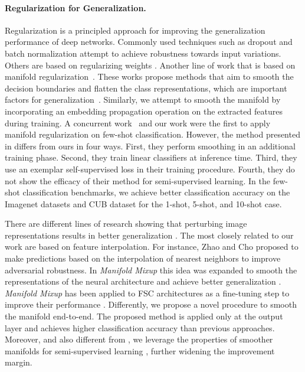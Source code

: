 \documentclass[runningheads]{llncs}
\begin{document}
\paragraph{Regularization for Generalization.} 
Regularization is a principled approach for improving the generalization performance of deep networks. Commonly used techniques such as dropout \cite{srivastava2014dropout} and batch normalization \cite{ioffe2015batch} attempt to achieve robustness towards input variations. Others are based on regularizing weights \cite{rodriguez2016regularizing,salimans2016weight}. Another line of work that is based on manifold regularization~\cite{zhang2018mixup,verma2019manifold,tokozume2018between,belkin2006manifold}. These works propose methods that aim to smooth the decision boundaries and flatten the class representations, which are important factors for generalization~\cite{lee1995lower,bartlett1999generalization}. Similarly, we attempt to smooth the manifold by incorporating an embedding propagation operation on the extracted features during training. A concurrent work~\cite{mangla2019charting} and our work were the  first to apply manifold regularization on few-shot classification. However, the method presented in \cite{mangla2019charting} differs from ours in four ways. First, they perform smoothing in an additional training phase. Second, they train linear classifiers at inference time. Third, they use an exemplar self-supervised loss in their training procedure. Fourth, they do not show the efficacy of their method for semi-supervised learning. In the few-shot classification benchmarks, we achieve better classification accuracy on the Imagenet datasets and CUB dataset for the 1-shot, 5-shot, and 10-shot case.

 There are different lines of research showing that perturbing image representations results in better generalization \cite{srivastava2014dropout,ioffe2015batch}. The most closely related to our work are based on feature interpolation. For instance, Zhao and Cho \cite{cho2019retrieval} proposed to make predictions based on the interpolation of nearest neighbors to improve adversarial robustness. In \textit{Manifold Mixup} this idea was expanded to smooth the representations of the neural architecture and achieve better generalization \cite{bartlett1999generalization,lee1995lower}. \textit{Manifold Mixup} has been applied to FSC architectures as a  fine-tuning step to improve their performance \cite{mangla2019charting}. Differently, we propose a novel procedure to smooth the manifold end-to-end. The proposed method is applied only at the output layer and achieves higher classification accuracy than previous approaches. Moreover, and also different from \cite{mangla2019charting}, we leverage the properties of smoother manifolds for semi-supervised learning \cite{chapelle2009semi}, further widening the improvement margin.
\end{document}

